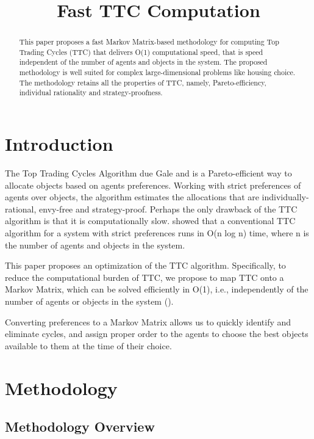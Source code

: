 
\title{Fast TTC Computation}
\maketitle
\begin{abstract}
    This paper proposes a fast Markov Matrix-based methodology for computing Top Trading Cycles (TTC) that delivers O(1) computational speed, that is speed independent of the number of agents and objects in the system. The proposed methodology is well suited for complex large-dimensional problems like housing choice. The methodology retains all the properties of TTC, namely, Pareto-efficiency, individual rationality and strategy-proofness.  
\end{abstract}
\section{Introduction}
\textbf{}The Top Trading Cycles Algorithm due Gale and \cite{SHAPLEY197423} is a Pareto-efficient way to allocate objects based on agents preferences. Working with strict preferences of agents over objects, the algorithm estimates the allocations that are individually-rational, envy-free and strategy-proof. Perhaps the only drawback of the TTC algorithm is that it is computationally slow. \cite{SabanSethuraman2013} showed that a conventional TTC algorithm for a system with strict preferences runs in O(n log n) time, where n is the number of agents and objects in the system. 

This paper proposes an optimization of the TTC algorithm. Specifically, to reduce the computational burden of TTC, we propose to map TTC onto a Markov Matrix, which can be solved efficiently in O(1), i.e., independently of the number of agents or objects in the system (\cite{SunEtAl2020}). 

Converting preferences to a Markov Matrix allows us to quickly identify and eliminate cycles, and assign proper order to the agents to choose the best objects available to them at the time of their choice. 

\section{Methodology}

\subsection{Methodology Overview}

